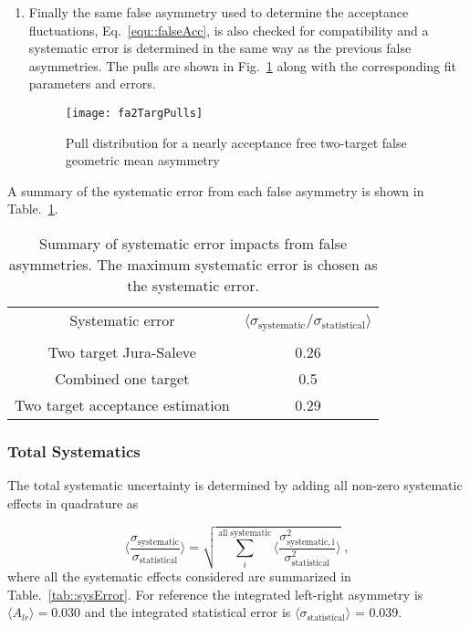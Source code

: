 \begin{enumerate}
\item Finally the same false asymmetry used to determine the acceptance
  fluctuations, Eq.~\ref{equ::falseAcc}, is also checked for compatibility and a
  systematic error is determined in the same way as the previous false
  asymmetries.  The pulls are shown in Fig.~\ref{fig::fa2TargPulls} along with
  the corresponding fit parameters and errors.

  \begin{figure}[h!t]
    \centering \texttt{[image: fa2TargPulls]}
    \caption{Pull distribution for a nearly acceptance free two-target false
      geometric mean asymmetry}
    \label{fig::fa2TargPulls}
  \end{figure}
  
\end{enumerate}

A summary of the systematic error from each false asymmetry is shown in
Table.~\ref{tab::faSys}.

\begin{table}[h!t]
  \centering
  \begin{tabular}{|c|c|}
    \hline Systematic error& \multirow{2}{9em}{$\langle
      \sigma_{\mathrm{systematic}}/\sigma_{\mathrm{statistical}}
      \rangle$}\\ & \\ \hline
    
    Two target Jura-Saleve& 0.26\\ \hline

    Combined one target& 0.5\\ \hline

    Two target acceptance estimation& 0.29\\ \hline
    
  \end{tabular}
  \caption{Summary of systematic error impacts from false asymmetries.  The
    maximum systematic error is chosen as the systematic error.}
  \label{tab::faSys}
\end{table}

\subsubsection{Total Systematics}
The total systematic uncertainty is determined by adding all non-zero systematic
effects in quadrature as

\begin{equation}
  \Big \langle \frac{
    \sigma_{\mathrm{systematic}}}{\sigma_{\mathrm{statistical}}} \Big \rangle =
  \sqrt{ \sum_i^{\mathrm{all \; systematic}} \Big \langle
    \frac{\sigma^2_{\mathrm{systematic, i}}}{\sigma^2_{\mathrm{statistical}}}
    \Big \rangle } \;,
\end{equation}
where all the systematic effects considered are summarized in
Table.~\ref{tab::sysError}.  For reference the integrated left-right asymmetry
is $\langle A_{lr} \rangle = 0.030$ and the integrated statistical error is
$\langle \sigma_{\mathrm{statistical}} \rangle$ = 0.039.

